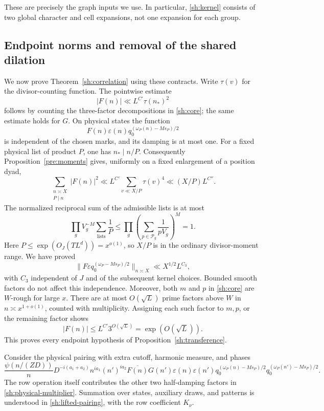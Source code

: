 These are precisely the graph inputs we use.  In particular,
\eqref{sh:kernel} consists of two global character and cell expansions,
not one expansion for each group.

\subsection{Endpoint norms and removal of the shared dilation}

We now prove Theorem~\ref{sh:correlation} using these contracts.
Write $\tau(v)$ for the divisor-counting function.  The pointwise
estimate
\begin{equation}\label{sh:core-divisor}
 |F(n)|\ll L^{C'}\tau(n_*)^2
\end{equation}
follows by counting the three-factor decompositions in
\eqref{sh:core}; the same estimate holds for $G$.
On physical states the function
\[
 F(n)\varepsilon(n)q_0^{(\omega_P(n)-Ms_P)/2}
\]
is independent of the chosen marks, and its damping is at most one.
For a fixed physical list of product $P$, one has $n_*\mid n/P$.
Consequently Proposition~\ref{pre:moments} gives, uniformly on a fixed
enlargement of a position dyad,
\[
 \sum_{\substack{n\asymp X\\P\mid n}}|F(n)|^2
 \ll L^{C'}\sum_{v\ll X/P}\tau(v)^4
 \ll (X/P)L^{C''}.
\]
The normalized reciprocal sum of the admissible lists is at most
\[
 \prod_g V_g^{-M}
       \sum_{\text{lists}}\frac1P
 \leq\prod_g\left(\sum_{p\in\mathcal P_g}\frac1{pV_g}\right)^M=1.
\]
Here $P\leq\exp(O_J(TL^d))=x^{o(1)}$, so $X/P$ is in the
ordinary divisor-moment range.  We have proved
\begin{equation}\label{sh:endpoint-norm}
 \|F\varepsilon q_0^{(\omega_P-Ms_P)/2}\|_{n\asymp X}
 \ll X^{1/2}L^{C_3},
\end{equation}
with $C_3$ independent of $J$ and of the subsequent kernel choices.
Bounded smooth factors do not affect this independence.  Moreover,
both $m$ and $p$ in \eqref{sh:core} are $W$-rough for large $x$.
There are at most $O(\sqrt L)$ prime factors above $W$ in
$n\asymp x^{1+o(1)}$, counted with multiplicity.  Assigning each such
factor to $m,p$, or the remaining factor shows
\begin{equation}\label{sh:endpoint-sup}
 |F(n)|\leq L^{C'}3^{O(\sqrt L)}=\exp(O(\sqrt L)).
\end{equation}
This proves every endpoint hypothesis of Proposition~\ref{sh:transference}.

Consider the physical pairing with extra cutoff, harmonic measure,
and phases
\begin{equation}\label{sh:lifted-pairing}
 \frac{\psi(n/(ZD))}{n}
 D^{-i(a_1+a_2)}n^{ia_1}(n')^{ia_2}
 \overline{F(n)}G(n')\varepsilon(n)\varepsilon(n')
 q_0^{(\omega_P(n)-Ms_P)/2}q_0^{(\omega_P(n')-Ms_P)/2}.
\end{equation}
The row operation itself contributes the other two half-damping
factors in \eqref{sh:physical-multiplier}.  Summation over states,
auxiliary draws, and patterns is understood in
\eqref{sh:lifted-pairing}, with the row coefficient $K_\nu$.

